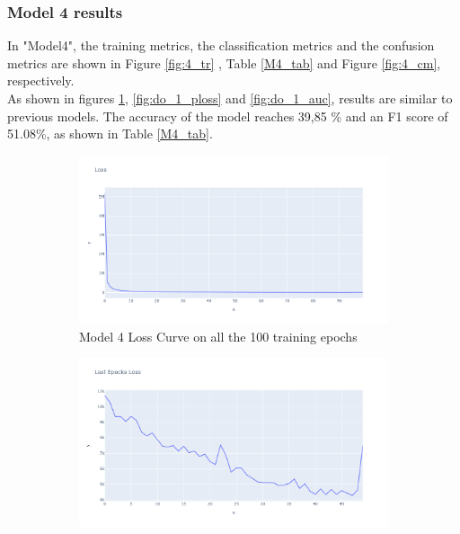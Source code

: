 \subsubsection{Model 4 results}
In "Model4", the training metrics, the classification metrics and the confusion metrics are shown in Figure \ref{fig:4_tr} , Table \ref{M4_tab} and Figure \ref{fig:4_cm}, respectively.\\
  As shown in figures \ref{fig:do_1_tloss}, \ref{fig:do_1_ploss} and \ref{fig:do_1_auc}, results are similar to previous models. The accuracy of the model reaches 39,85 \% and an F1 score of 51.08\%, as shown in Table \ref{M4_tab}.
\begin{figure}[H]%
    \centering
    \begin{subfigure}{0.49\textwidth}
        \centering
        \includegraphics[width=\linewidth]{figures/ev/do_1_tloss.png}
        \caption{Model 4 Loss Curve on all the 100 training epochs}
    \label{fig:do_1_tloss}
    \end{subfigure}
    \begin{subfigure}{0.49\textwidth}
        \centering
         \includegraphics[width=\linewidth]{figures/ev/do_1_ploss.png}

\end{subfigure}
\end{figure}
